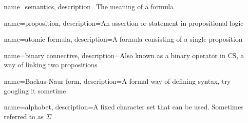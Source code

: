 {
    name={semantics},
    description={The meaning of a formula}
}

{
    name={proposition},
    description={An assertion or statement in propositional logic}
}

{
    name={atomic formula},
    description={A formula consisting of a single proposition}
}

{
    name={binary connective},
    description={Also known as a binary operator in CS, a way of linking two propositions}
}

{
    name={Backus-Naur form},
    description={A formal way of defining syntax, try googling it sometime}
}

{
    name={alphabet},
    description={A fixed character set that can be used. Sometimes referred to as $\Sigma$}
}
